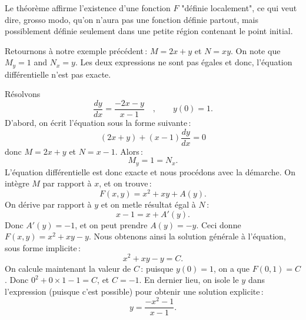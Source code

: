 Le théorème affirme l'existence d'une fonction $F$ "définie localement", ce qui veut dire, grosso modo, qu'on n'aura pas une fonction définie partout, mais possiblement définie seulement dans une petite région contenant le point initial. 

Retournons à notre exemple précédent\,: $M = 2x + y$ et $N = xy$.  
On note que 
$M_y = 1$ and  $N_x =
y$.  Les deux expressions ne sont pas égales et donc, l'équation différentielle n'est pas exacte.

\begin{example}
Résolvons 
\begin{equation*}
\frac{dy}{dx} = \frac{-2x-y}{x-1} \quad , \qquad y(0) = 1.
\end{equation*}
D'abord, on écrit l'équation sous la forme suivante\,: 
\begin{equation*}
(2x+y) + (x-1)\frac{dy}{dx} = 0 
\end{equation*}
donc $M = 2x+y$ et $N = x-1$.  Alors\,: 
\begin{equation*}
M_y = 1 = N_x .
\end{equation*}
L'équation différentielle est donc exacte et nous procédons avec la démarche.
On intègre $M$ par rapport à $x$, et on trouve\,: 
\begin{equation*}
F(x,y) = x^2+xy + A(y) .
\end{equation*}
On dérive par rapport à $y$ et on metle résultat égal à $N$\,: 
\begin{equation*}
x-1 = x + A'(y) .
\end{equation*}
Donc $A'(y) = -1$, et on peut prendre $A(y) = -y$.  Ceci donne $F(x,y) = x^2+xy-y$.  Nous obtenons ainsi la solution générale à l'équation, sous forme implicite\,:
\begin{equation*}
 x^2+xy-y = C.  
\end{equation*}
On calcule maintenant la valeur de $C$\,: puisque $y(0)=1$, on a que 
$F(0,1) = C$.  Donc $0^2+0\times 1 - 1 = C$, et $C=-1$.  En dernier lieu, on isole le $y$ dans l'expression (puisque c'est possible) pour obtenir une solution explicite\,: 
\begin{equation*}
y = \frac{-x^2-1}{x-1} .
\end{equation*}
\end{example}

